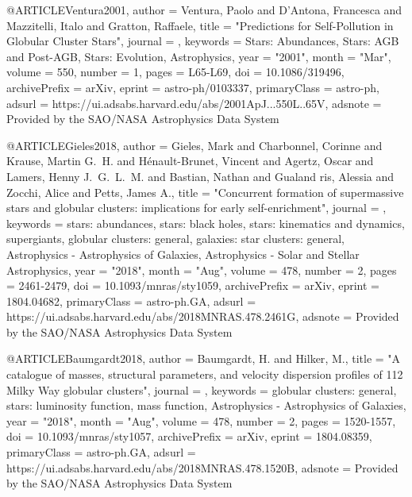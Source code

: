 \documentclass[twocolumn,tighten]{aastex63}
\begin{document}
{@ARTICLE{Ventura2001,
       author = {{Ventura}, Paolo and {D'Antona}, Francesca and {Mazzitelli}, Italo and
         {Gratton}, Raffaele},
        title = "{Predictions for Self-Pollution in Globular Cluster Stars}",
      journal = {\apjl},
     keywords = {Stars: Abundances, Stars: AGB and Post-AGB, Stars: Evolution, Astrophysics},
         year = "2001",
        month = "Mar",
       volume = {550},
       number = {1},
        pages = {L65-L69},
          doi = {10.1086/319496},
archivePrefix = {arXiv},
       eprint = {astro-ph/0103337},
 primaryClass = {astro-ph},
       adsurl = {https://ui.adsabs.harvard.edu/abs/2001ApJ...550L..65V},
      adsnote = {Provided by the SAO/NASA Astrophysics Data System}
}


@ARTICLE{Gieles2018,
       author = {{Gieles}, Mark and {Charbonnel}, Corinne and {Krause}, Martin G.~H. and
         {H{\'e}nault-Brunet}, Vincent and {Agertz}, Oscar and
         {Lamers}, Henny J.~G.~L.~M. and {Bastian}, Nathan and {Gualand
        ris}, Alessia and {Zocchi}, Alice and {Petts}, James A.},
        title = "{Concurrent formation of supermassive stars and globular clusters: implications for early self-enrichment}",
      journal = {\mnras},
     keywords = {stars: abundances, stars: black holes, stars: kinematics and dynamics, supergiants, globular clusters: general, galaxies: star clusters: general, Astrophysics - Astrophysics of Galaxies, Astrophysics - Solar and Stellar Astrophysics},
         year = "2018",
        month = "Aug",
       volume = {478},
       number = {2},
        pages = {2461-2479},
          doi = {10.1093/mnras/sty1059},
archivePrefix = {arXiv},
       eprint = {1804.04682},
 primaryClass = {astro-ph.GA},
       adsurl = {https://ui.adsabs.harvard.edu/abs/2018MNRAS.478.2461G},
      adsnote = {Provided by the SAO/NASA Astrophysics Data System}
}

@ARTICLE{Baumgardt2018,
       author = {{Baumgardt}, H. and {Hilker}, M.},
        title = "{A catalogue of masses, structural parameters, and velocity dispersion profiles of 112 Milky Way globular clusters}",
      journal = {\mnras},
     keywords = {globular clusters: general, stars: luminosity function, mass function, Astrophysics - Astrophysics of Galaxies},
         year = "2018",
        month = "Aug",
       volume = {478},
       number = {2},
        pages = {1520-1557},
          doi = {10.1093/mnras/sty1057},
archivePrefix = {arXiv},
       eprint = {1804.08359},
 primaryClass = {astro-ph.GA},
       adsurl = {https://ui.adsabs.harvard.edu/abs/2018MNRAS.478.1520B},
      adsnote = {Provided by the SAO/NASA Astrophysics Data System}
}

}
\end{document}
